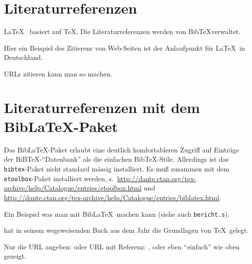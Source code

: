 \section{Literaturreferenzen}

\LaTeX\ \cite{lamport.1995a} basiert auf \TeX \cite{knuth.1984a}.
Die Literaturreferenzen werden von Bib\TeX verwaltet.

Hier ein Beispiel des Zitierens von Web-Seiten
\cite{dante.2010a} ist der Anlaufpunkt für \LaTeX\ in Deutschland.

URLs zitieren kann man so \cite{dante.2010a} machen.

\section{Literaturreferenzen mit dem Bib\LaTeX-Paket}

Das Bib\LaTeX-Paket erlaubt eine deutlich komfortableren Zugriff auf Einträge der
BiB\TeX-"`Datenbank"' als die einfachen Bib\TeX-Stile. Allerdings ist das \texttt{bibtex}-Paket
nicht standard mässig installiert. Es muß zusammen mit dem \texttt{etoolbox}-Paket installiert
werden, s.\
\url{http://dante.ctan.org/tex-archive/help/Catalogue/entries/etoolbox.html} und\\
\url{http://dante.ctan.org/tex-archive/help/Catalogue/entries/biblatex.html}.


Ein Beispiel was man mit Bib\LaTeX\ machen kann (siehe auch \texttt{bericht.s}).

 hat in seinem wegeweisenden Buch
 aus dem Jahr \citeyear{knuth.1984a}
die Grundlagen von \TeX\ gelegt.

Nur die URL angeben:  oder URL mit Referenz:
\citeurlref{dante.2010a}, oder eben "`einfach"' wie oben gezeigt.


